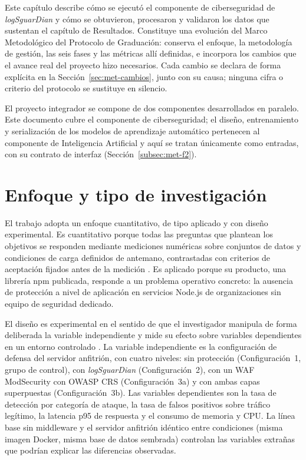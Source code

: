Este capítulo describe cómo se ejecutó el componente de ciberseguridad de \textit{logSguarDian} y
cómo se obtuvieron, procesaron y validaron los datos que sustentan el capítulo de Resultados.
Constituye una evolución del Marco Metodológico del Protocolo de Graduación: conserva el
enfoque, la metodología de gestión, las seis fases y las métricas allí definidas, e incorpora los
cambios que el avance real del proyecto hizo necesarios. Cada cambio se declara de forma
explícita en la Sección~\ref{sec:met-cambios}, junto con su causa; ninguna cifra o criterio del
protocolo se sustituye en silencio.

El proyecto integrador se compone de dos componentes desarrollados en paralelo. Este documento
cubre el componente de ciberseguridad; el diseño, entrenamiento y serialización de los modelos
de aprendizaje automático pertenecen al componente de Inteligencia Artificial y aquí se tratan
únicamente como entradas, con su contrato de interfaz (Sección~\ref{subsec:met-f2}).

\section{Enfoque y tipo de investigación}
\label{sec:met-enfoque}

El trabajo adopta un enfoque cuantitativo, de tipo aplicado y con diseño experimental. Es
cuantitativo porque todas las preguntas que plantean los objetivos se responden mediante
mediciones numéricas sobre conjuntos de datos y condiciones de carga definidos de antemano,
contrastadas con criterios de aceptación fijados antes de la medición
\cite{hernandez2014}. Es aplicado porque su producto, una librería npm publicada, responde a un
problema operativo concreto: la ausencia de protección a nivel de aplicación en servicios
Node.js de organizaciones sin equipo de seguridad dedicado.

El diseño es experimental en el sentido de que el investigador manipula de forma deliberada la
variable independiente y mide su efecto sobre variables dependientes en un entorno controlado
\cite{hernandez2014}. La variable independiente es la configuración de defensa del servidor
anfitrión, con cuatro niveles: sin protección (Configuración~1, grupo de control), con
\textit{logSguarDian} (Configuración~2), con un WAF ModSecurity con OWASP CRS (Configuración~3a)
y con ambas capas superpuestas (Configuración~3b). Las variables dependientes son la tasa de
detección por categoría de ataque, la tasa de falsos positivos sobre tráfico legítimo, la
latencia p95 de respuesta y el consumo de memoria y CPU. La línea base sin middleware y el
servidor anfitrión idéntico entre condiciones (misma imagen Docker, misma base de datos
sembrada) controlan las variables extrañas que podrían explicar las diferencias observadas.

